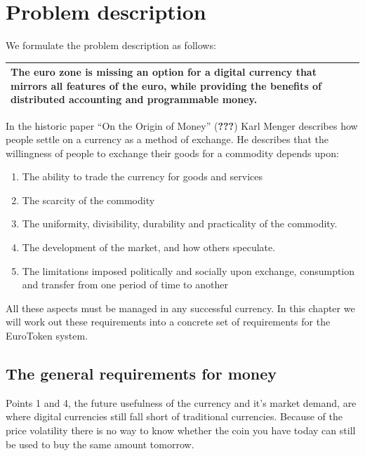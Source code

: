 \documentclass[whitelogo]{tudelft-report}
\providecommand{\tightlist}{%
  \setlength{\itemsep}{0pt}\setlength{\parskip}{0pt}}
\begin{document}
\chapter{Problem description}\label{problem-description}

We formulate the problem description as follows:

\begin{longtable}[]{@{}l@{}}
\toprule
\begin{minipage}[t]{0.97\columnwidth}\raggedright\strut
The euro zone is missing an option for a digital currency that mirrors
all features of the euro, while providing the benefits of distributed
accounting and programmable money.\strut
\end{minipage}\tabularnewline
\bottomrule
\end{longtable}

In the historic paper ``On the Origin of Money'' ({\textbf{???}}) Karl
Menger describes how people settle on a currency as a method of
exchange. He describes that the willingness of people to exchange their
goods for a commodity depends upon:

\begin{enumerate}
\def\labelenumi{\arabic{enumi}.}
\tightlist
\item
  The ability to trade the currency for goods and services
\item
  The scarcity of the commodity
\item
  The uniformity, divisibility, durability and practicality of the
  commodity.
\item
  The development of the market, and how others speculate.
\item
  The limitations imposed politically and socially upon exchange,
  consumption and transfer from one period of time to another
\end{enumerate}

All these aspects must be managed in any successful currency. In this
chapter we will work out these requirements into a concrete set of
requirements for the EuroToken system.

\section{The general requirements for
money}\label{the-general-requirements-for-money}

Points 1 and 4, the future usefulness of the currency and it's market
demand, are where digital currencies still fall short of traditional
currencies. Because of the price volatility there is no way to know
whether the coin you have today can still be used to buy the same amount
tomorrow.
\end{document}
